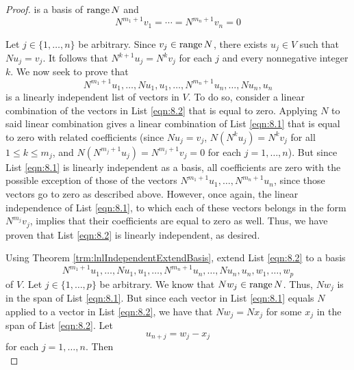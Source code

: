 \documentclass[../main.tex]{subfiles}
\begin{document}
\begin{itemize}
\begin{theorem}
\begin{proof}
            is a basis of $\operatorname{range} N$ and
            \begin{equation*}
                N^{m_1+1}v_1 = \cdots = N^{m_n+1}v_n = 0
            \end{equation*}\par
            Let $j\in\{1,\dots,n\}$ be arbitrary. Since $v_j\in\operatorname{range} N$, there exists $u_j\in V$ such that $Nu_j=v_j$. It follows that $N^{k+1}u_j=N^kv_j$ for each $j$ and every nonnegative integer $k$. We now seek to prove that
            \begin{equation}\label{eqn:8.2}
                N^{m_1+1}u_1,\dots,Nu_1,u_1,\dots,N^{m_n+1}u_n,\dots,Nu_n,u_n
            \end{equation}
            is a linearly independent list of vectors in $V$. To do so, consider a linear combination of the vectors in List \ref{eqn:8.2} that is equal to zero. Applying $N$ to said linear combination gives a linear combination of List \ref{eqn:8.1} that is equal to zero with related coefficients (since $Nu_j=v_j$, $N(N^ku_j)=N^kv_j$ for all $1\leq k\leq m_j$, and $N(N^{m_j+1}u_j)=N^{m_j+1}v_j=0$ for each $j=1,\dots,n$). But since List \ref{eqn:8.1} is linearly independent as a basis, all coefficients are zero with the possible exception of those of the vectors $N^{m_1+1}u_1,\dots,N^{m_n+1}u_n$, since those vectors go to zero as described above. However, once again, the linear independence of List \ref{eqn:8.1}, to which each of these vectors belongs in the form $N^{m_j}v_j$, implies that their coefficients are equal to zero as well. Thus, we have proven that List \ref{eqn:8.2} is linearly independent, as desired.\par
            Using Theorem \ref{trm:lnlIndependentExtendBasis}, extend List \ref{eqn:8.2} to a basis
            \begin{equation}\label{eqn:8.3}
                N^{m_1+1}u_1,\dots,Nu_1,u_1,\dots,N^{m_n+1}u_n,\dots,Nu_n,u_n,w_1,\dots,w_p
            \end{equation}
            of $V$. Let $j\in\{1,\dots,p\}$ be arbitrary. We know that $Nw_j\in\operatorname{range} N$. Thus, $Nw_j$ is in the span of List \ref{eqn:8.1}. But since each vector in List \ref{eqn:8.1} equals $N$ applied to a vector in List \ref{eqn:8.2}, we have that $Nw_j=Nx_j$ for some $x_j$ in the span of List \ref{eqn:8.2}. Let
            \begin{equation*}
                u_{n+j} = w_j-x_j
            \end{equation*}
            for each $j=1,\dots,n$. Then
            \begin{equation*}

\end{equation*}
\end{proof}
\end{theorem}
\end{itemize}
\end{document}
